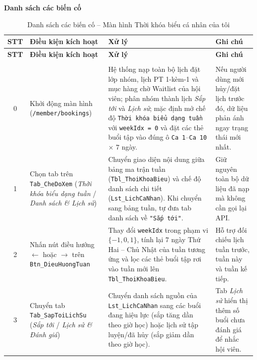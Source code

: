 \documentclass[a4paper,12pt]{article}
\begin{document}
\par\medskip\noindent\textbf{Danh sách các biến cố}\par\smallskip
{\footnotesize
\setlength{\tabcolsep}{4pt}
\begin{longtable}{|c|L{3.5cm}|L{7.8cm}|L{3.5cm}|}
\hline
\textbf{STT} & \textbf{Điều kiện kích hoạt} & \textbf{Xử lý} & \textbf{Ghi chú} \\
\hline
\endfirsthead
\hline
\textbf{STT} & \textbf{Điều kiện kích hoạt} & \textbf{Xử lý} & \textbf{Ghi chú} \\
\hline
\endhead
\hline
\endfoot
\hline
\caption{Danh sách các biến cố -- Màn hình Thời khóa biểu cá nhân của tôi} \\
\endlastfoot

0 & Khởi động màn hình (\texttt{/member/bookings}) &
Hệ thống nạp toàn bộ lịch đặt lớp nhóm, lịch PT 1-kèm-1 và mục hàng chờ Waitlist của hội viên; phân nhóm thành lịch \textit{Sắp tới} và \textit{Lịch sử}; mặc định mở chế độ \texttt{Thời khóa biểu dạng tuần} với \texttt{weekIdx = 0} và đặt các thẻ buổi tập vào đúng ô \texttt{Ca 1}--\texttt{Ca 10} $\times$ $7$ ngày. &
Nếu người dùng mới hủy/đặt lịch trước đó, dữ liệu phản ánh ngay trạng thái mới nhất. \\ \hline

1 & Chọn tab trên \texttt{Tab\_CheDoXem} (\textit{Thời khóa biểu dạng tuần} / \textit{Danh sách \& Lịch sử}) &
Chuyển giao diện nội dung giữa bảng ma trận tuần (\texttt{Tbl\_ThoiKhoaBieu}) và chế độ danh sách chi tiết (\texttt{Lst\_LichCaNhan}). Khi chuyển sang bảng tuần, tự đưa tab danh sách về \texttt{"Sắp tới"}. &
Giữ nguyên toàn bộ dữ liệu đã nạp mà không cần gọi lại API. \\ \hline

2 & Nhấn nút điều hướng \texttt{$\leftarrow$} hoặc \texttt{$\rightarrow$} trên \texttt{Btn\_DieuHuongTuan} &
Thay đổi \texttt{weekIdx} trong phạm vi $\{-1, 0, 1\}$, tính lại $7$ ngày Thứ Hai -- Chủ Nhật của tuần tương ứng và lọc các thẻ buổi tập rơi vào tuần mới lên \texttt{Tbl\_ThoiKhoaBieu}. &
Hỗ trợ đối chiếu lịch tuần trước, tuần này và tuần kế tiếp. \\ \hline

3 & Chuyển tab \texttt{Tab\_SapToiLichSu} (\textit{Sắp tới} / \textit{Lịch sử \& Đánh giá}) &
Chuyển danh sách nguồn của \texttt{Lst\_LichCaNhan} sang các buổi đang hiệu lực (sắp tăng dần theo giờ học) hoặc lịch sử tập luyện/đã hủy (sắp giảm dần theo giờ học). &
Tab \textit{Lịch sử} hiển thị thêm số buổi chưa đánh giá để nhắc hội viên. \\ \hline


\end{longtable}}
\end{document}
